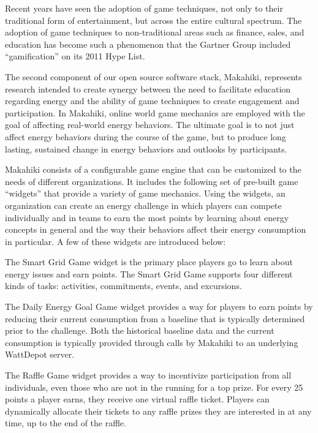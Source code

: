 \documentclass{acm_proc_article-sp}
\begin{document}
Recent years have seen the adoption of game techniques, not only to their traditional form
of entertainment, but across the entire cultural spectrum. The adoption of game techniques
to non-traditional areas such as finance, sales, and education has become such a phenomenon
that the Gartner Group included ``gamification'' on its 2011 Hype List.

The second component of our open source software stack, Makahiki, represents research
intended to create synergy between the need to facilitate education regarding energy and
the ability of game techniques to create engagement and participation.  In Makahiki,
online world game mechanics are employed with the goal of affecting real-world energy
behaviors.  The ultimate goal is to not just affect energy behaviors during the course of
the game, but to produce long lasting, sustained change in energy behaviors and outlooks
by participants.

Makahiki consists of a configurable game engine that can be customized to the needs of
different organizations.  It includes the following set of pre-built game ``widgets'' that
provide a variety of game mechanics.  Using the widgets, an organization can create an
energy challenge in which players can compete individually and in teams to earn the most
points by learning about energy concepts in general and the way their behaviors affect
their energy consumption in particular. A few of these widgets are introduced below:


The Smart Grid Game widget is the primary place players go to learn about energy issues and earn
points.  The Smart Grid Game supports four different kinds of tasks: activities,
commitments, events, and excursions. 

The Daily Energy Goal Game widget provides a way for players to earn points by reducing their
current consumption from a baseline that is typically determined prior to the challenge.
Both the historical baseline data and the current consumption is typically provided
through calls by Makahiki to an underlying WattDepot server.

The Raffle Game widget provides a way to incentivize participation from all individuals, even
those who are not in the running for a top prize. For every 25 points a player earns, they
receive one virtual raffle ticket. Players can dynamically allocate their tickets to any
raffle prizes they are interested in at any time, up to the end of the raffle.
\end{document}
